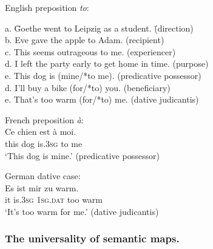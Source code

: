 \largerpage[-1]
\ea
English preposition {\em to}:
\label{e:to-dative}
\begin{tabbing}
a. \hspace{0,3cm}    \= Goethe went to Leipzig as a student.  \hspace{1cm} \= (direction)\\
b. \> Eve gave the apple to Adam. \> (recipient)\\
c. \> This seems outrageous to me. \> (experiencer)\\
d. \> I left the party early to get home in time. \> (purpose)\\
e. \> This dog is (mine/*to me). \> (predicative possessor)\\
d. \> I'll buy a bike (for/*to) you. \> (beneficiary) \\
e. \> That's too warm (for/*to) me. \> (dative judicantis)\\
\end{tabbing}
\item French preposition {\em à}:
\\
\gll Ce chien est à moi.\\
this dog is.3\textsc{sg} to me\\
\glt `This dog is mine.' (predicative possessor)\\

\item German dative case:
\\
\gll Es ist mir zu warm.\\
it is.\textsc{3sg} 1\textsc{sg}.\textsc{dat} too warm\\
\glt `It's too warm for me.' (dative judicantis)\\
\z

\subsubsection{The universality of semantic maps.}

